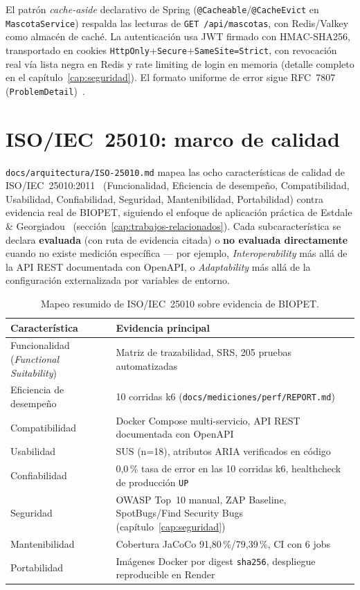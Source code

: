 El patr\'on \emph{cache-aside} declarativo de Spring
(\texttt{@Cacheable}/\texttt{@CacheEvict} en \texttt{MascotaService})
respalda las lecturas de \texttt{GET /api/mascotas}, con Redis/Valkey como
almac\'en de cach\'e. La autenticaci\'on usa JWT firmado con HMAC-SHA256,
transportado en cookies \texttt{HttpOnly}+\texttt{Secure}+\texttt{SameSite=Strict},
con revocaci\'on real v\'ia lista negra en Redis y rate limiting de login
en memoria (detalle completo en el cap\'itulo~\ref{cap:seguridad}). El
formato uniforme de error sigue RFC~7807 (\texttt{ProblemDetail})~\cite{rfc7807}.

\section{ISO/IEC~25010: marco de calidad}
\label{sec:iso25010}

\texttt{docs/arquitectura/ISO-25010.md} mapea las ocho caracter\'isticas de
calidad de ISO/IEC~25010:2011~\cite{iso25010-2011} (Funcionalidad,
Eficiencia de desempe\~no, Compatibilidad, Usabilidad, Confiabilidad,
Seguridad, Mantenibilidad, Portabilidad) contra evidencia real de BIOPET,
siguiendo el enfoque de aplicaci\'on pr\'actica de Estdale \&
Georgiadou~\cite{estdale2018applying25010} (secci\'on~\ref{cap:trabajos-relacionados}).
Cada subcaracter\'istica se declara \textbf{evaluada} (con ruta de
evidencia citada) o \textbf{no evaluada directamente} cuando no existe
medici\'on espec\'ifica --- por ejemplo, \emph{Interoperability} m\'as
all\'a de la API REST documentada con OpenAPI, o \emph{Adaptability} m\'as
all\'a de la configuraci\'on externalizada por variables de entorno.

\begin{table}[H]
  \centering
  \small
  \caption{Mapeo resumido de ISO/IEC~25010 sobre evidencia de BIOPET.}
  \label{tab:iso25010-resumen}
  \begin{tabular}{@{}p{3.4cm}p{9.4cm}@{}}
    \toprule
    Caracter\'istica & Evidencia principal \\
    \midrule
    Funcionalidad (\emph{Functional Suitability}) & Matriz de trazabilidad, SRS, 205 pruebas automatizadas \\
    Eficiencia de desempe\~no & 10 corridas k6 (\texttt{docs/mediciones/perf/REPORT.md}) \\
    Compatibilidad & Docker Compose multi-servicio, API REST documentada con OpenAPI \\
    Usabilidad & SUS (n=18), atributos ARIA verificados en c\'odigo \\
    Confiabilidad & 0{,}0\,\% tasa de error en las 10 corridas k6, healthcheck de producci\'on \texttt{UP} \\
    Seguridad & OWASP Top~10 manual, ZAP Baseline, SpotBugs/Find Security Bugs (cap\'itulo~\ref{cap:seguridad}) \\
    Mantenibilidad & Cobertura JaCoCo 91{,}80\,\%/79{,}39\,\%, CI con 6 jobs \\
    Portabilidad & Im\'agenes Docker por digest \texttt{sha256}, despliegue reproducible en Render \\
    \bottomrule
  \end{tabular}
\end{table}
